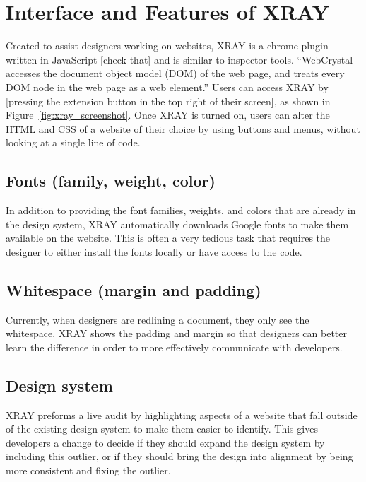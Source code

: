 \documentclass{sigchi}
\newcommand{\xray}{XRAY\xspace}
\begin{document}

\section{Interface and Features of XRAY}
Created to assist designers working on websites, \xray is a chrome plugin written in JavaScript [check that] and is similar to inspector tools. ``WebCrystal accesses the document object model (DOM) of the web page, and treats every DOM node in the web page as a web element.'' Users can access \xray by [pressing the extension button in the top right of their screen], as shown in Figure~\ref{fig:xray_screenshot}. Once \xray is turned on, users can alter the HTML and CSS of a website of their choice by using buttons and menus, without looking at a single line of code. 

\subsection{Fonts (family, weight, color)}
In addition to providing the font families, weights, and colors that are already in the design system, \xray 
automatically downloads Google fonts to make them available on the website. This is often a very tedious task that requires the designer to either install the fonts locally or have access to the code.

\subsection{Whitespace (margin and padding)}
Currently, when designers are redlining a document, they only see the whitespace. \xray shows the padding and margin so that designers can better learn the difference in order to more effectively communicate with developers. 

\subsection{Design system}
\xray preforms a live audit by highlighting aspects of a website that fall outside of the existing design system to make them easier to identify. This gives developers a change to decide if they should expand the design system by including this outlier, or if they should bring the design into alignment by being more consistent and fixing the outlier. 
\end{document}
